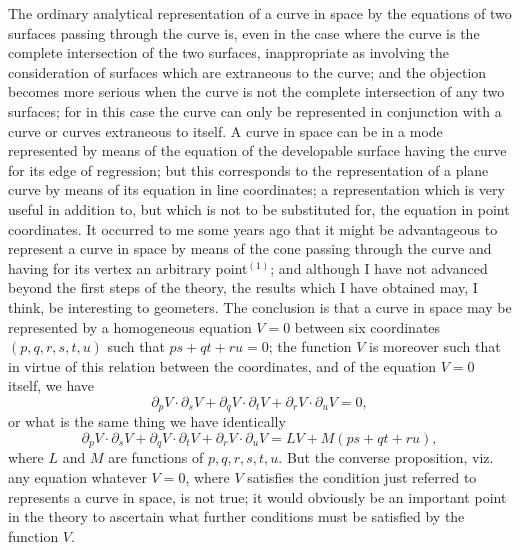 \documentclass[11pt,a4paper]{article}
\theoremstyle{plain}
\begin{document}
The ordinary analytical representation of a curve in space by the equations of two surfaces passing through the curve is, even in the case where the curve is the complete intersection of the two surfaces, inappropriate as involving the consideration of surfaces which are extraneous to the curve; and the objection becomes more serious when the curve is not the complete intersection of any two surfaces; for in this case the curve can only be represented in conjunction with a curve or curves extraneous to itself. A curve in space can be in a mode represented by means of the equation of the developable surface having the curve for its edge of regression; but this corresponds to the representation of a plane curve by means of its equation in line coordinates; a representation which is very useful in addition to, but which is not to be substituted for, the equation in point coordinates. It occurred to me some years ago that it might be advantageous to represent a curve in space by means of the cone passing through the curve and having for its vertex an arbitrary point$^{(1)}$; and although I have not advanced beyond the first steps of the theory, the results which I have obtained may, I think, be interesting to geometers. The conclusion is that a curve in space may be represented by a homogeneous equation $V = 0$ between six coordinates $(p, q, r, s, t, u)$ such that $ps + qt + ru = 0$; the function $V$ is moreover such that in virtue of this relation between the coordinates, and of the equation $V = 0$ itself, we have
\[
\partial_p V \cdot \partial_s V + \partial_q V \cdot \partial_t V + \partial_r V \cdot \partial_u V = 0,
\]
or what is the same thing we have identically
\[
\partial_p V \cdot \partial_s V + \partial_q V \cdot \partial_t V + \partial_r V \cdot \partial_u V = LV + M(ps + qt + ru),
\]
where $L$ and $M$ are functions of $p, q, r, s, t, u$. But the converse proposition, viz. any equation whatever $V = 0$, where $V$ satisfies the condition just referred to represents a curve in space, is not true; it would obviously be an important point in the theory to ascertain what further conditions must be satisfied by the function $V$.
\end{document}
